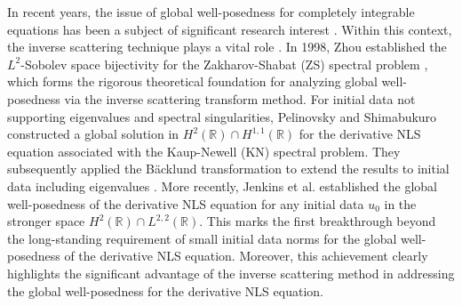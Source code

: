 \documentclass[preprint,compress,12pt]{elsarticle}
\numberwithin{equation}{section}
\begin{document}
In recent years, the issue of global well-posedness for completely integrable equations has been a subject of significant research interest \cite{Bah1,Bah2,Ha1,Ha2,Jen1,Jen2,Jenkins,Killip1,Killip2,Liu16,Pel1,Pel2}. Within this context, the inverse scattering technique plays a vital role \cite{Jen1,Jen2,Jenkins,Liu16,Pel1,Pel2}. In 1998, Zhou established the $L^{2}$-Sobolev space bijectivity for the Zakharov-Shabat (ZS) spectral problem \cite{Zhou1998}, which forms the rigorous theoretical foundation for analyzing global well-posedness via the inverse scattering transform method.
For initial data not supporting eigenvalues and spectral singularities,  Pelinovsky and Shimabukuro \cite{Pel2} constructed a global solution in $H^{2}(\mathbb{R})\cap H^{1,1}(\mathbb{R})$ for the derivative NLS equation associated with the Kaup-Newell (KN) spectral problem. They subsequently applied the B\"{a}cklund transformation to extend the results to initial data including eigenvalues \cite{Pel1}.
More recently, Jenkins et al. \cite{Jenkins} established the global well-posedness of the derivative NLS equation for any initial data $u_{0}$
in the stronger space $H^{2}(\mathbb{R})\cap L^{2,2}(\mathbb{R})$. This marks the first breakthrough beyond the long-standing requirement of small initial data norms for the global well-posedness of the derivative NLS equation. Moreover, this achievement clearly highlights the significant advantage of the inverse scattering method in addressing the global well-posedness for the derivative NLS equation.
\end{document}
